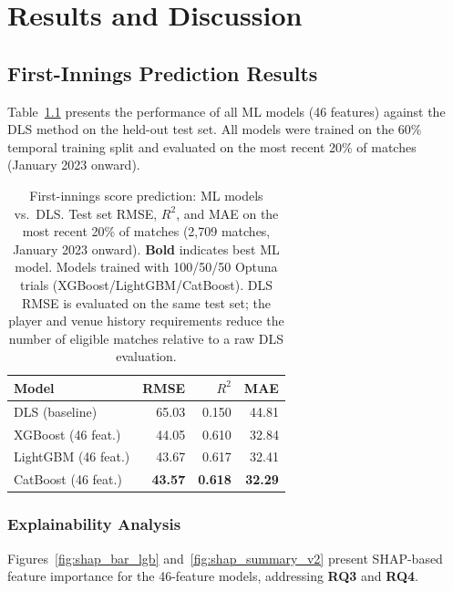 \documentclass[12pt,a4paper,oneside]{report}
\begin{document}
\chapter{Results and Discussion}
\label{ch:results}


\section{First-Innings Prediction Results}
\label{sec:inn1_results}

Table~\ref{tab:inn1_v2} presents the performance of all ML models (46 features) against the DLS method on the held-out test set.  All models were trained on the 60\% temporal training split and evaluated on the most recent 20\% of matches (January 2023 onward).

\begin{table}[htbp]
\centering
\caption[First-innings score prediction: ML models vs.\ DLS]{First-innings score prediction: ML models vs.\ DLS.  Test set RMSE, $R^2$, and MAE on the most recent 20\% of matches (2,709 matches, January 2023 onward).  \textbf{Bold} indicates best ML model.  Models trained with 100/50/50 Optuna trials (XGBoost/LightGBM/CatBoost).  DLS RMSE is evaluated on the same test set; the player and venue history requirements reduce the number of eligible matches relative to a raw DLS evaluation.}
\label{tab:inn1_v2}
\small
\begin{tabular}{lrrr}
\toprule
\textbf{Model} & \textbf{RMSE} & $R^2$ & \textbf{MAE} \\
\midrule
DLS (baseline)        & 65.03 & 0.150 & 44.81 \\
\midrule
XGBoost (46 feat.)    & 44.05 & 0.610 & 32.84 \\
LightGBM (46 feat.)   & 43.67 & 0.617 & 32.41 \\
CatBoost (46 feat.)   & \textbf{43.57} & \textbf{0.618} & \textbf{32.29} \\
\bottomrule
\end{tabular}
\end{table}

\subsection{Explainability Analysis}
\label{sec:explainability}

Figures~\ref{fig:shap_bar_lgb} and~\ref{fig:shap_summary_v2} present SHAP-based feature importance for the 46-feature models, addressing \textbf{RQ3} and \textbf{RQ4}.
\end{document}
